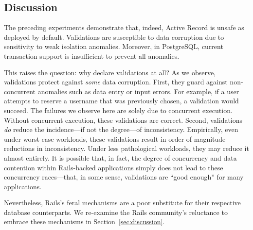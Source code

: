 \subsection{Discussion}

The preceding experiments demonstrate that, indeed, Active Record is
unsafe as deployed by default. Validations are susceptible to data
corruption due to sensitivity to weak isolation anomalies. Moreover,
in PostgreSQL, current transaction support is insufficient to prevent
all anomalies.

This raises the question: why declare validations at all? As we
observe, validations protect against \textit{some} data
corruption. First, they guard against non-concurrent anomalies such as
data entry or input errors. For example, if a user attempts to reserve
a username that was previously chosen, a validation would succeed. The
failures we observe here are solely due to concurrent
execution. Without concurrent execution, these validations are
correct. Second, validations \textit{do} reduce the incidence---if not
the degree---of inconsistency. Empirically, even under worst-case
workloads, these validations result in order-of-magnitude reductions
in inconsistency. Under less pathological workloads, they may reduce
it almost entirely. It is possible that, in fact, the degree of
concurrency and data contention within Rails-backed applications
simply does not lead to these concurrency races---that, in some sense,
validations are ``good enough'' for many applications.

Nevertheless, Rails's feral mechanisms are a poor substitute for their
respective database counterparts. We re-examine the Rails community's
reluctance to embrace these mechanisms in Section~\ref{sec:discussion}.

